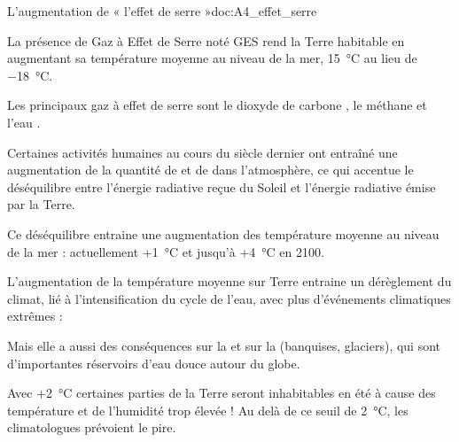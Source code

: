 \begin{doc}{L'augmentation de « l'effet de serre »}{doc:A4_effet_serre}
  
  La présence de Gaz à Effet de Serre noté GES rend la Terre habitable en augmentant sa température moyenne au niveau de la mer, \qty{15}{\degreeCelsius} au lieu de \qty{-18}{\degreeCelsius}.

  \begin{importants}  
    Les principaux gaz à effet de serre sont le dioxyde de carbone ,
    le méthane  et l'eau .
  \end{importants}

  Certaines activités humaines au cours du siècle dernier ont entraîné une augmentation de la quantité de  et de  dans l'atmosphère, ce qui accentue le déséquilibre entre l'énergie radiative reçue du Soleil et l'énergie radiative émise par la Terre.

  Ce déséquilibre entraine une augmentation des température moyenne au niveau de la mer : actuellement +\qty{1}{\degreeCelsius} et jusqu'à +\qty{4}{\degreeCelsius} en 2100.

  \begin{importants}
    L'augmentation de la température moyenne sur Terre entraine un dérèglement du climat, lié à l'intensification du cycle de l'eau, avec plus d'événements climatiques extrêmes : 
  \end{importants}
  \begin{importants}
    Mais elle a aussi des conséquences sur la  et sur la  (banquises, glaciers), qui sont d'importantes réservoirs d'eau douce autour du globe.
  \end{importants}

  Avec +\qty{2}{\degreeCelsius} certaines parties de la Terre seront inhabitables en été à cause des température et de l'humidité trop élevée ! 
  Au delà de ce seuil de \qty{2}{\degreeCelsius}, les climatologues prévoient le pire.
\end{doc}


